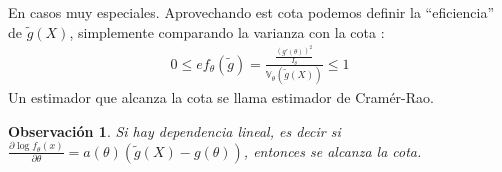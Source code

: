 \documentclass[10pt]{article}
\theoremstyle{plain}
\newtheorem{obs}{Observación}
\theoremstyle{definition}
\begin{document}
En casos muy especiales. Aprovechando est cota podemos definir la ``eficiencia'' de $\tilde{g}(X)$, simplemente comparando la varianza con la cota :
\begin{align*}
0 \le ef_{\theta}(\tilde{g}) = \frac{\frac{(g'(\theta))^2}{I_{\theta}}}{\mathbb{V}_{\theta}(\tilde{g}(X))} \le 1
\end{align*}
Un estimador que alcanza la cota se llama estimador de Cramér-Rao.

\begin{obs}
Si hay dependencia lineal, es decir si $\frac{\partial \log f_{\theta}(x)}{\partial \theta} = a(\theta)(\tilde{g}(X)-g(\theta))$, entonces se alcanza la cota.
\end{obs}
\end{document}
